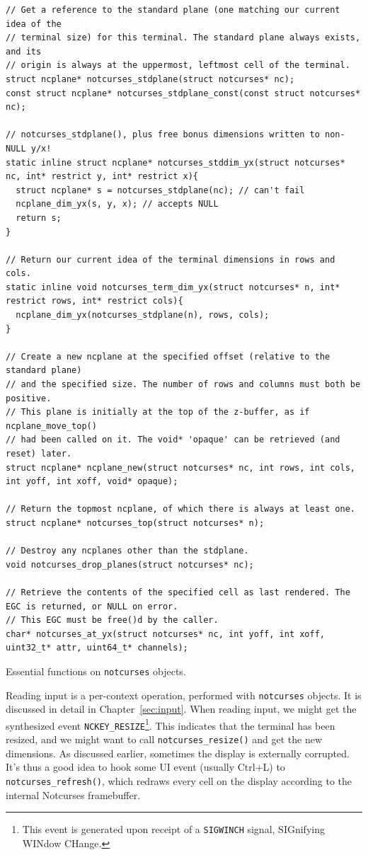 \documentclass[letterpaper,10pt]{article}
\begin{document}
\begin{listing}[!htb]
\begin{verbatim}
// Get a reference to the standard plane (one matching our current idea of the
// terminal size) for this terminal. The standard plane always exists, and its
// origin is always at the uppermost, leftmost cell of the terminal.
struct ncplane* notcurses_stdplane(struct notcurses* nc);
const struct ncplane* notcurses_stdplane_const(const struct notcurses* nc);

// notcurses_stdplane(), plus free bonus dimensions written to non-NULL y/x!
static inline struct ncplane* notcurses_stddim_yx(struct notcurses* nc, int* restrict y, int* restrict x){
  struct ncplane* s = notcurses_stdplane(nc); // can't fail
  ncplane_dim_yx(s, y, x); // accepts NULL
  return s;
}

// Return our current idea of the terminal dimensions in rows and cols.
static inline void notcurses_term_dim_yx(struct notcurses* n, int* restrict rows, int* restrict cols){
  ncplane_dim_yx(notcurses_stdplane(n), rows, cols);
}

// Create a new ncplane at the specified offset (relative to the standard plane)
// and the specified size. The number of rows and columns must both be positive.
// This plane is initially at the top of the z-buffer, as if ncplane_move_top()
// had been called on it. The void* 'opaque' can be retrieved (and reset) later.
struct ncplane* ncplane_new(struct notcurses* nc, int rows, int cols, int yoff, int xoff, void* opaque);

// Return the topmost ncplane, of which there is always at least one.
struct ncplane* notcurses_top(struct notcurses* n);

// Destroy any ncplanes other than the stdplane.
void notcurses_drop_planes(struct notcurses* nc);

// Retrieve the contents of the specified cell as last rendered. The EGC is returned, or NULL on error.
// This EGC must be free()d by the caller.
char* notcurses_at_yx(struct notcurses* nc, int yoff, int xoff, uint32_t* attr, uint64_t* channels);
\end{verbatim}
\caption{Essential functions on \texttt{notcurses} objects.}
\end{listing}

Reading input is a per-context operation, performed with \texttt{notcurses}
objects. It is discussed in detail in Chapter~\ref{sec:input}. When reading
input, we might get the synthesized event \texttt{NCKEY\_RESIZE}\footnote{This
event is generated upon receipt of a \texttt{SIGWINCH} signal, SIGnifying WINdow
CHange.}. This indicates that the terminal has been resized, and we might want
to call \texttt{notcurses\_resize()} and get the new dimensions. As discussed
earlier, sometimes the display is externally corrupted. It's thus a good idea
to hook some UI event (usually Ctrl+L) to \texttt{notcurses\_refresh()}, which
redraws every cell on the display according to the internal Notcurses
framebuffer.
\end{document}
